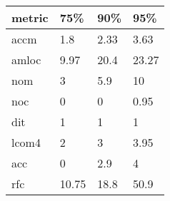 \begin{tabular}{|l|l|l|l|}
\hline
metric&75\%&90\%&95\%\\
\hline
accm&1.8&2.33&3.63\\
\hline
amloc&9.97&20.4&23.27\\
\hline
nom&3&5.9&10\\
\hline
noc&0&0&0.95\\
\hline
dit&1&1&1\\
\hline
lcom4&2&3&3.95\\
\hline
acc&0&2.9&4\\
\hline
rfc&10.75&18.8&50.9\\
\hline
\end{tabular}
